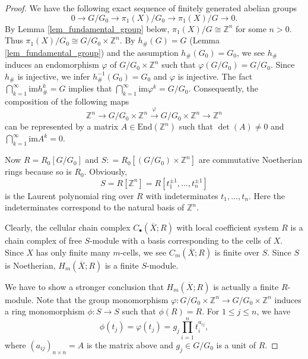 \documentclass[12pt]{amsart}
\theoremstyle{plain}
\theoremstyle{definition}
\theoremstyle{question}
\theoremstyle{remark}
\theoremstyle{assumption}
\numberwithin{equation}{section}
\theoremstyle{bigthm}
\begin{document}
\begin{proof}
We have the following exact sequence of finitely generated abelian groups
\[
0 \rightarrow G/G_{0} \rightarrow \pi_{1} (X)/G_{0} \rightarrow \pi_{1} (X)/G \rightarrow 0.
\]
By Lemma \ref{lem_fundamental_group} below, $\pi_{1} (X)/G \cong \mathbb{Z}^{n}$ for some $n>0$. Thus $\pi_{1} (X)/G_{0} \cong G/G_{0} \times \mathbb{Z}^{n}$. By $h_{\#} (G) = G$ (Lemma \ref{lem_fundamental_group}) and the assumption $h_{\#} (G_{0}) = G_{0}$, we see $h_{\#}$ induces an endomorphism $\varphi$ of $G/G_{0} \times \mathbb{Z}^{n}$ such that $\varphi (G/G_{0}) = G/G_{0}$. Since $h_{\#}$ is injective, we infer $h_{\#}^{-1} (G_{0}) = G_{0}$ and $\varphi$ is injective. The fact $\bigcap_{k=1}^{\infty} \mathrm{im} h_{\#}^{k} =G$ implies that $\bigcap_{k=1}^{\infty} \mathrm{im} \varphi^{k} = G/G_{0}$. Consequently, the composition of the following maps
\[
\mathbb{Z}^{n} \rightarrow G/G_{0} \times \mathbb{Z}^{n} \overset{\varphi}{\longrightarrow} G/G_{0} \times \mathbb{Z}^{n} \rightarrow \mathbb{Z}^{n}
\]
can be represented by a matrix $A \in \mathrm{End} (\mathbb{Z}^{n})$ such that $\det (A) \neq 0$ and $\bigcap_{k=1}^{\infty} \mathrm{im} A^{k} =0$.

Now $R= R_{0} [G/G_{0}]$ and $S: = R_{0} [(G/G_{0}) \times \mathbb{Z}^{n}]$ are commutative Noetherian rings because so is $R_{0}$. Obviously,
\[
S= R[\mathbb{Z}^{n}] = R[t_{1}^{\pm 1}, \dots, t_{n}^{\pm 1}]
\]
is the Laurent polynomial ring over $R$ with indeterminates $t_{1}, \dots, t_{n}$. Here the indeterminates correspond to the natural basis of $\mathbb{Z}^{n}$.

Clearly, the cellular chain complex $C_{\bullet} (\overline{X}; R)$ with local coefficient system $R$ is a chain complex of free $S$-module with a basis corresponding to the cells of $X$. Since $X$ has only finite many $m$-cells, we see $C_{m} (\overline{X}; R)$ is finite over $S$. Since $S$ is Noetherian, $H_{m} (\overline{X}; R)$ is a finite $S$-module.

We have to show a stronger conclusion that $H_{m} (\overline{X}; R)$ is actually a finite $R$-module. Note that the group monomorphism $\varphi \colon  G/G_{0} \times \mathbb{Z}^{n} \rightarrow G/G_{0} \times \mathbb{Z}^{n}$ induces a ring monomorphism $\phi \colon  S \rightarrow S$ such that $\phi (R) =R$. For $1 \leq j \leq n$, we have
\[
\phi (t_{j}) = \varphi (t_{j}) = g_{j} \prod_{i=1}^{n} t_{i}^{a_{ij}},
\]
where $(a_{ij})_{n \times n} =A$ is the matrix above and $g_{j} \in G/G_{0}$ is a unit of $R$.


\end{proof}
\end{document}
